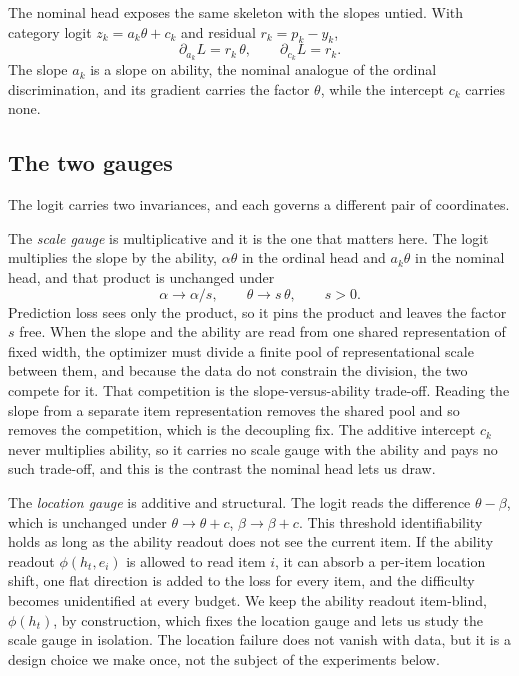 \documentclass[sigconf,nonacm,screen]{acmart}
\begin{document}
The nominal head exposes the same skeleton with the slopes untied. With category
logit $z_k=a_k\theta+c_k$ and residual $r_k=p_k-y_k$,
\begin{equation}
\partial_{a_k}L=r_k\,\theta,\qquad
\partial_{c_k}L=r_k.
\label{eq:nrm-grad}
\end{equation}
The slope $a_k$ is a slope on ability, the nominal analogue of the ordinal
discrimination, and its gradient carries the factor $\theta$, while the intercept
$c_k$ carries none.

\subsection{The two gauges}
The logit carries two invariances, and each governs a different pair of
coordinates.

The \emph{scale gauge} is multiplicative and it is the one that matters here. The
logit multiplies the slope by the ability, $\alpha\theta$ in the ordinal head and
$a_k\theta$ in the nominal head, and that product is unchanged under
\begin{equation}
\alpha\to\alpha/s,\qquad \theta\to s\,\theta,\qquad s>0.
\label{eq:scale-gauge}
\end{equation}
Prediction loss sees only the product, so it pins the product and leaves the factor
$s$ free. When the slope and the ability are read from one shared representation of
fixed width, the optimizer must divide a finite pool of representational scale
between them, and because the data do not constrain the division, the two compete
for it. That competition is the slope-versus-ability trade-off. Reading the slope
from a separate item representation removes the shared pool and so removes the
competition, which is the decoupling fix. The additive intercept $c_k$ never
multiplies ability, so it carries no scale gauge with the ability and pays no such
trade-off, and this is the contrast the nominal head lets us draw.

The \emph{location gauge} is additive and structural. The logit reads the
difference $\theta-\beta$, which is unchanged under $\theta\to\theta+c$,
$\beta\to\beta+c$. This threshold identifiability holds as long as the ability
readout does not see the current item. If the ability readout $\phi(h_t,e_i)$ is
allowed to read item $i$, it can absorb a per-item location shift, one flat
direction is added to the loss for every item, and the difficulty becomes
unidentified at every budget. We keep the ability readout item-blind, $\phi(h_t)$,
by construction, which fixes the location gauge and lets us study the scale gauge in
isolation. The location failure does not vanish with data, but it is a design choice
we make once, not the subject of the experiments below.
\end{document}
